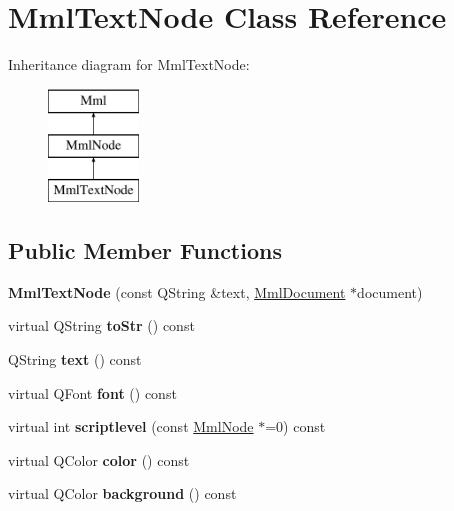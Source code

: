 \hypertarget{class_mml_text_node}{}\section{Mml\+Text\+Node Class Reference}
\label{class_mml_text_node}
Inheritance diagram for Mml\+Text\+Node\+:\begin{figure}[H]
\begin{center}
\leavevmode
\includegraphics[height=3.000000cm]{class_mml_text_node}
\end{center}
\end{figure}
\subsection*{Public Member Functions}
\begin{DoxyCompactItemize}
\item 
\mbox{\label{class_mml_text_node_ab0b7d75535d66636247b69e46fb1c66e}} 
{\bfseries Mml\+Text\+Node} (const Q\+String \&text, \mbox{\hyperlink{class_mml_document}{Mml\+Document}} $\ast$document)
\item 
\mbox{\label{class_mml_text_node_a8b25c3547cb2d32d478a26e08b695ed8}} 
virtual Q\+String {\bfseries to\+Str} () const
\item 
\mbox{\label{class_mml_text_node_af7c72e7aa434239164fabee8b4a7b81a}} 
Q\+String {\bfseries text} () const
\item 
\mbox{\label{class_mml_text_node_a527e670c05af5d66a4a7bc1abf1f1025}} 
virtual Q\+Font {\bfseries font} () const
\item 
\mbox{\label{class_mml_text_node_a25f1a39bbb3e08d73fe8e2d9b27eaf88}} 
virtual int {\bfseries scriptlevel} (const \mbox{\hyperlink{class_mml_node}{Mml\+Node}} $\ast$=0) const
\item 
\mbox{\label{class_mml_text_node_a89c435d8f963b30e93daf508ec2ddeee}} 
virtual Q\+Color {\bfseries color} () const
\item 
\mbox{\label{class_mml_text_node_ae8f8b9ae49d73c4d8da44d015ddc19df}} 
virtual Q\+Color {\bfseries background} () const
\end{DoxyCompactItemize}
